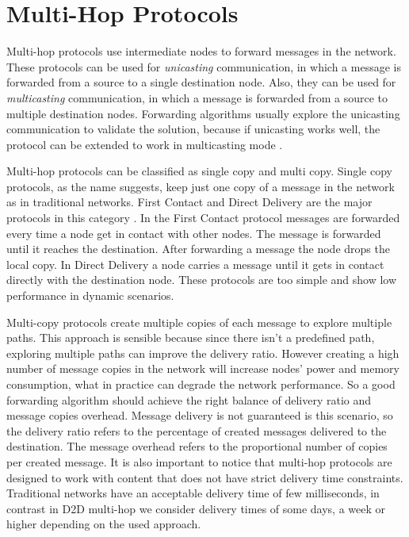 \section{Multi-Hop Protocols} 

Multi-hop protocols use intermediate nodes to forward messages in the network. These protocols can be used for \textit{unicasting} communication, in which a message is forwarded from
a source to a single destination node. Also, they can be used for \textit{multicasting} communication, in which a message is forwarded from a source to multiple destination nodes. Forwarding algorithms usually explore the unicasting communication to validate the solution, because if unicasting works well, the protocol can be extended to work in multicasting mode \citep{misra2016opportunistic}.

Multi-hop protocols can be classified as single copy and multi copy. Single copy protocols, as the name suggests, keep just one copy of a message in the network as in traditional networks. First Contact and Direct Delivery are the major protocols in this category \citep{misra2016opportunistic}. In the First Contact protocol messages are forwarded every time a node get in contact with other nodes. The message is forwarded until it reaches the destination. After forwarding a message the node drops the local copy. In Direct Delivery a node carries a message until it gets in contact directly with the destination node. These protocols are too simple and show low performance in dynamic scenarios.

Multi-copy protocols create multiple copies of each message to explore multiple paths. This approach is sensible because since there isn't a predefined path, exploring multiple paths can improve the delivery ratio. However creating a high number of message copies in the network will increase nodes' power and memory consumption, what in practice can degrade the network performance. So a good forwarding algorithm should achieve the right balance of delivery ratio and message copies overhead. Message delivery is not guaranteed is this scenario, so the delivery ratio refers to the percentage of created messages delivered to the destination. The message overhead refers to the proportional number of
copies per created message. It is also important to notice that multi-hop protocols are designed to work with content that does not have strict delivery time constraints. Traditional networks have an acceptable
delivery time of few milliseconds, in contrast in D2D multi-hop we consider delivery times of some days, a week or higher depending on the used approach.

